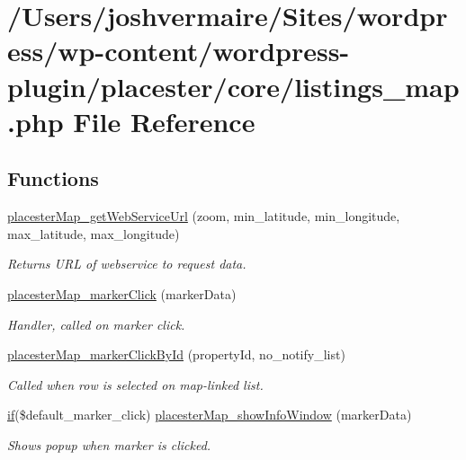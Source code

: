 \hypertarget{listings__map_8php}{
\section{/Users/joshvermaire/Sites/wordpress/wp-\/content/wordpress-\/plugin/placester/core/listings\_\-map.php File Reference}
\label{dc/d04/listings__map_8php}
}
\subsection*{Functions}
\begin{DoxyCompactItemize}
\item 
\hyperlink{listings__map_8php_a1707114d30bfd099a9368f5e7bbe56cc}{placesterMap\_\-getWebServiceUrl} (zoom, min\_\-latitude, min\_\-longitude, max\_\-latitude, max\_\-longitude)
\begin{DoxyCompactList}\small\item\em Returns URL of webservice to request data. \end{DoxyCompactList}\item 
\hyperlink{listings__map_8php_a610ed8c75a2ecda2f507f155477cad56}{placesterMap\_\-markerClick} (markerData)
\begin{DoxyCompactList}\small\item\em Handler, called on marker click. \end{DoxyCompactList}\item 
\hyperlink{listings__map_8php_a2e03aca11458b2129b22b8e344df3382}{placesterMap\_\-markerClickById} (propertyId, no\_\-notify\_\-list)
\begin{DoxyCompactList}\small\item\em Called when row is selected on map-\/linked list. \end{DoxyCompactList}\item 
\hyperlink{listings__list__lone__divbased_8php_a0b49fff73af3a13232913ea65ca484d9}{if}(\$default\_\-marker\_\-click) \hyperlink{listings__map_8php_ad281e29d4c85bd9f7c35ef6dc3ee3d17}{placesterMap\_\-showInfoWindow} (markerData)
\begin{DoxyCompactList}\small\item\em Shows popup when marker is clicked. \end{DoxyCompactList}\end{DoxyCompactItemize}

